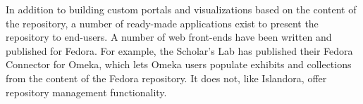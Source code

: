 In addition to building custom portals and visualizations based on the content of the repository, a number of ready-made applications exist to present the repository to end-users. A number of web front-ends have been written and published for Fedora\cite{fedora-frontends}. For example, the Scholar's Lab has published their Fedora Connector for Omeka, which lets Omeka users populate exhibits and collections from the content of the Fedora repository. It does not, like Islandora, offer repository management functionality\cite{fedora-connector}. 
